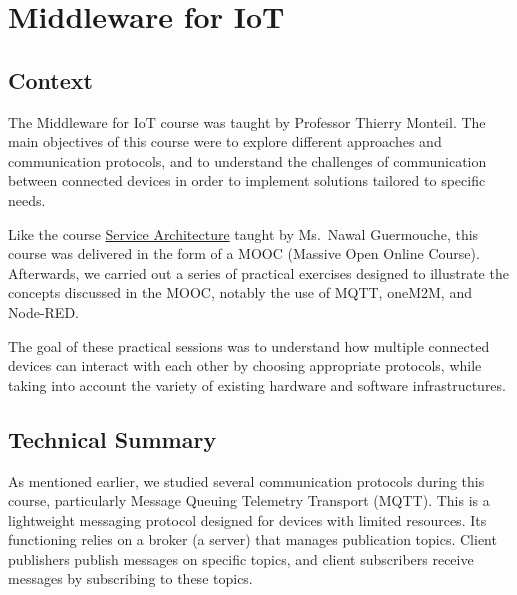 


\section{Middleware for IoT}
\subsection{Context}
The Middleware for IoT course was taught by Professor Thierry Monteil. The main objectives of this course were to explore different approaches and communication protocols, and to understand the challenges of communication between connected devices in order to implement solutions tailored to specific needs.

Like the course \hyperref[sec:service_architecture]{Service Architecture} taught by Ms.\ Nawal Guermouche, this course was delivered in the form of a MOOC (Massive Open Online Course). Afterwards, we carried out a series of practical exercises designed to illustrate the concepts discussed in the MOOC, notably the use of MQTT, oneM2M, and Node-RED.

The goal of these practical sessions was to understand how multiple connected devices can interact with each other by choosing appropriate protocols, while taking into account the variety of existing hardware and software infrastructures.

\subsection{Technical Summary}
As mentioned earlier, we studied several communication protocols during this course, particularly Message Queuing Telemetry Transport (MQTT). This is a lightweight messaging protocol designed for devices with limited resources. Its functioning relies on a broker (a server) that manages publication topics. Client publishers publish messages on specific topics, and client subscribers receive messages by subscribing to these topics.

